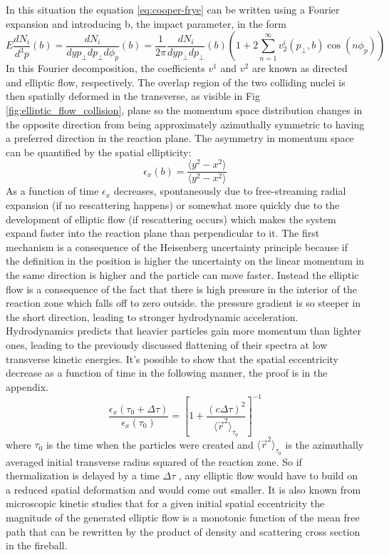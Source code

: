 \documentclass[12pt,a4paper]{book}
\begin{document}
	In this situation the equation \ref{eq:cooper-frye} can be written using a Fourier expansion and introducing b, the impact parameter, in the form
	\begin{equation}
		E \frac{dN_i}{d^3 p}(b)= \frac{dN_i}{dy p_\perp dp_\perp d\phi_p} (b) = \frac{1}{2\pi} \frac{dN_i}{dy p_\perp dp_\perp} (b) \left(1 + 2 \sum_{n=1}^{\infty} v_2^i(p_\perp,b) \cos(n\phi_p) \right)
	\end{equation}
	In this Fourier decomposition, the coefficients $v^1$ and $v^2$	are known as directed and elliptic flow, respectively. The overlap region of the two colliding nuclei is then spatially deformed in the transverse, as visible in Fig \ref{fig:elliptic_flow_collision}, plane so the momentum space distribution changes in the opposite direction from being approximately azimuthally symmetric to having a preferred direction in the reaction plane. The asymmetry in momentum space can be quantified by the spatial ellipticity:
	\begin{equation}
		\epsilon_x(b)=\frac{\langle y^2 - x^2\rangle}{\langle y^2 - x^2\rangle}
		\label{eq:anisotropy}
	\end{equation}
	As a function of time $\epsilon_x$ decreases, spontaneously due to free-streaming radial expansion (if no rescattering happens) or somewhat more quickly due to the development of elliptic flow (if rescattering occurs) which makes the system expand faster into the reaction plane than perpendicular to it. The first mechanism is a consequence of the Heisenberg uncertainty principle because if the definition in the position is higher the uncertainty on the linear momentum in the same direction is higher and the particle can move faster. Instead the elliptic flow is a consequence of the fact that there is high pressure in the interior of the reaction zone which falls off to zero outside. the pressure gradient is so steeper in the short direction, leading to stronger hydrodynamic acceleration. Hydrodynamics predicts that heavier particles gain more momentum than lighter ones, leading to the previously discussed flattening of their spectra at low transverse kinetic energies. It's possible to show that the spatial eccentricity decrease as a function of time in the following manner, the proof is in the appendix.
	\begin{equation}
		\frac{\epsilon_x(\tau_0 + \Delta \tau)}{\epsilon_x(\tau_0)} = \left[1+ \frac{(c \Delta \tau)^2}{\langle \vec{r}^2 \rangle_{\tau_0}} \right]^{-1}
	\end{equation}
	where $\tau_0$ is the time when the particles were created and $\langle \vec{r}^2 \rangle_{\tau_0}$ is the azimuthally averaged initial transverse radius squared of the reaction zone. So if thermalization is delayed by a time $\Delta \tau$ , any elliptic flow would have to build on a reduced spatial deformation and would come out smaller. It is also known from microscopic kinetic studies that for	a given initial spatial eccentricity the magnitude of the generated elliptic flow is a monotonic function of the mean free path that can be rewritten by the product of density and scattering cross section in the fireball.
	
\end{document}
